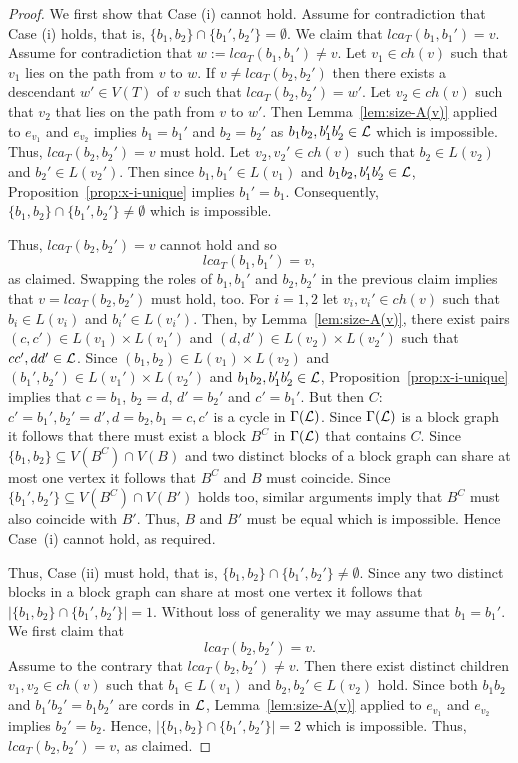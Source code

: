 \begin{proof}
  We first show that Case (i) cannot hold. Assume for contradiction that Case
  (i) holds, that is, $\{b_1,b_2\}\cap\{b_1',b_2'\}=\emptyset $.  We claim
  that $lca_T(b_1,b_1')=v$. Assume for contradiction that
  $w:=lca_T(b_1,b_1')\not=v$. Let $v_1\in ch(v)$ such that $v_1$ lies on the
  path from $v$ to $w$. If $v\not =lca_T(b_2,b_2')$ then there exists a
  descendant $w'\in V(T)$ of $v$ such that $lca_T(b_2,b_2')=w'$. Let $v_2\in
  ch(v)$ such that $v_2$ that lies on the path from $v$ to $w'$. Then
  Lemma~\ref{lem:size-A(v)} applied to $e_{v_1}$ and $e_{v_2}$ implies
  $b_1=b_1'$ and $b_2=b_2'$ as $b_1b_2,b_1'b_2'\in {\mathcal L}$ which is
  impossible. Thus, $lca_T(b_2,b_2')=v$ must hold. Let $v_2,v_2'\in ch(v)$
  such that $b_2\in L(v_2)$ and $b_2'\in L(v_2')$.  Then since $b_1,b_1'\in
  L(v_1)$ and $b_1b_2, b_1'b_2'\in {\mathcal L}$, Proposition~\ref{prop:x-i-unique}
  implies $b_1'=b_1$.  Consequently,
  $\{b_1,b_2\}\cap\{b_1',b_2'\}\not=\emptyset $ which is impossible.

  Thus, $lca_T(b_2,b_2')=v$ cannot hold and so
  $$
  lca_T(b_1,b_1')=v,
  $$ 
  as claimed.  Swapping the roles of $b_1,b_1'$ and $b_2,b_2'$ in the previous
  claim implies that $v= lca_T(b_2,b_2')$ must hold, too.  For $i=1,2$ let
  $v_i,v_i'\in ch(v)$ such that $b_i\in L(v_i)$ and $b_i'\in L(v_i')$.  Then,
  by Lemma~\ref{lem:size-A(v)}, there exist pairs $(c,c')\in L(v_1)\times
  L(v_1')$ and $(d,d')\in L(v_2)\times L(v_2')$ such that $cc',dd'\in{\mathcal L}$.
  Since $(b_1,b_2)\in L(v_1)\times L(v_2)$ and $(b_1',b_2')\in L(v_1')\times
  L(v_2')$ and $b_1b_2,b_1'b_2'\in{\mathcal L}$, Proposition~\ref{prop:x-i-unique}
  implies that $c=b_1$, $b_2=d$, $d'=b_2'$ and $c'=b_1'$. But then $C$:
  $c'=b_1',b_2'=d', d=b_2, b_1=c,c'$ is a cycle in $\Gamma({\mathcal L})$.  Since
  $\Gamma({\mathcal L})$ is a block graph it follows that there must exist a block
  $B^C$ in $\Gamma({\mathcal L})$ that contains $C$.  Since $\{b_1,b_2\}\subseteq
  V(B^C)\cap V(B)$ and two distinct blocks of a block graph can share at most
  one vertex it follows that $B^C$ and $B$ must coincide. Since
  $\{b_1',b_2'\}\subseteq V(B^C)\cap V(B')$ holds too, similar arguments imply
  that $B^C$ must also coincide with $B'$.  Thus, $B$ and $B'$ must be equal
  which is impossible.  Hence Case~(i) cannot hold, as required.

  Thus, Case (ii) must hold, that is,
  $\{b_1,b_2\}\cap\{b_1',b_2'\}\not=\emptyset $. Since any two distinct blocks
  in a block graph can share at most one vertex it follows that
  $|\{b_1,b_2\}\cap\{b_1',b_2'\}|=1$.  Without loss of generality we may
  assume that $b_1=b_1'$.  We first claim that
  $$
  lca_T(b_2,b_2')=v.
  $$
  Assume to the contrary that $lca_T(b_2,b_2')\not=v$.  Then there exist
  distinct children $v_1,v_2 \in ch(v)$ such that $b_1\in L(v_1)$ and
  $b_2,b_2'\in L(v_2)$ hold.  Since both $b_1b_2$ and $b_1'b_2'=b_1b_2'$ are
  cords in ${\mathcal L}$, Lemma~\ref{lem:size-A(v)} applied to $e_{v_1}$ and $e_{v_2}$
  implies $b_2'=b_2$. Hence, $|\{b_1,b_2\}\cap\{b_1',b_2'\}|=2$ which is
  impossible. Thus, $lca_T(b_2,b_2')=v$, as claimed.


\end{proof}
